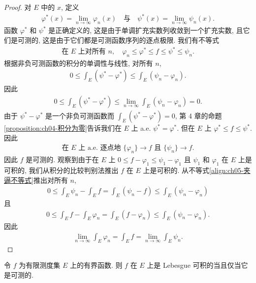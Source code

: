 \documentclass[../../main.tex]{subfiles}
\begin{document}
\begin{proof}
对 $E$ 中的 $x$, 定义
\begin{align*}
\varphi^{*}(x)=\lim_{n\to\infty}\varphi_{n}(x)\quad\text{与}\quad\psi^{*}(x)=\lim_{n\to\infty}\psi_{n}(x).
\end{align*}
函数 $\varphi^{*}$ 和 $\psi^{*}$ 是正确定义的, 这是由于单调扩充实数列收敛到一个扩充实数, 且它们是可测的, 这是由于它们都是可测函数序列的逐点极限. 我们有不等式
\begin{align}
\text{在 }E\text{ 上对所有 }n,\quad\varphi_{n}\leqslant\varphi^{*}\leqslant f\leqslant\psi^{*}\leqslant\psi_{n}.\label{align:ch05-夹逼不等式}
\end{align}
根据非负可测函数的积分的单调性与线性, 对所有 $n$,
\begin{align*}
0\leqslant\int_{E}(\psi^{*}-\varphi^{*})\leqslant\int_{E}(\psi_{n}-\varphi_{n}).
\end{align*}
因此
\begin{align*}
0\leqslant\int_{E}(\psi^{*}-\varphi^{*})\leqslant\lim_{n\to\infty}\int_{E}(\psi_{n}-\varphi_{n})=0.
\end{align*}
由于 $\psi^{*}-\varphi^{*}$ 是一个非负可测函数而 $\int_{E}(\psi^{*}-\varphi^{*})=0$, 第 4 章的命题\cref{proposition:ch04-积分为零}告诉我们在 $E$ 上 a.e. $\psi^{*}=\varphi^{*}$. 但在 $E$ 上 $\varphi^{*}\leqslant f\leqslant\psi^{*}$. 因此
\begin{align*}
\text{在 }E\text{ 上 a.e. 逐点地 }\{\varphi_{n}\}\to f\text{ 且 }\{\psi_{n}\}\to f.
\end{align*}
因此 $f$ 是可测的. 观察到由于在 $E$ 上 $0\leqslant f-\varphi_{1}\leqslant\psi_{1}-\varphi_{1}$ 且 $\psi_{1}$ 和 $\varphi_{1}$ 在 $E$ 上是可积的, 我们从积分的比较判别法推出 $f$ 在 $E$ 上是可积的. 从不等式\eqref{align:ch05-夹逼不等式}推出对所有 $n$,
\begin{align*}
0\leqslant\int_{E}\psi_{n}-\int_{E}f=\int_{E}(\psi_{n}-f)\leqslant\int_{E}(\psi_{n}-\varphi_{n})
\end{align*}
且
\begin{align*}
0\leqslant\int_{E}f-\int_{E}\varphi_{n}=\int_{E}(f-\varphi_{n})\leqslant\int_{E}(\psi_{n}-\varphi_{n}).
\end{align*}
因此
\begin{align*}
\lim_{n\to\infty}\int_{E}\varphi_{n}=\int_{E}f=\lim_{n\to\infty}\int_{E}\psi_{n}.
\end{align*}
\end{proof}

\begin{theorem}\label{theorem:ch05-有界可积可测}
令 $f$ 为有限测度集 $E$ 上的有界函数. 则 $f$ 在 $E$ 上是 Lebesgue 可积的当且仅当它是可测的.
\end{theorem}
\end{document}
